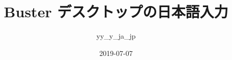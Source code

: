 




\documentclass[cjk,dvipdfmx,12pt]{beamer}
\usepackage{monthlypresentation}



\title{Buster デスクトップの日本語入力}
\author{yy\_y\_ja\_jp}
\date{2019-07-07}



